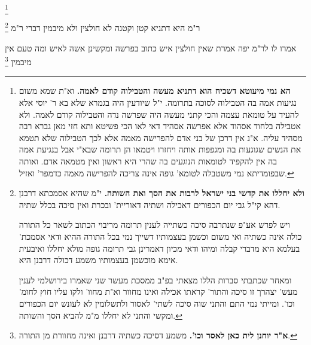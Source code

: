 \documentclass[12pt, openany]{book}
\newcommand{\sethebfont}{
\fontsize{10.5pt}{21.0pt} \selectfont
}
\newcommand{\twocol}[1]{
	{\sethebfont \begin{multicols}{2}
			#1
	\end{multicols}}	
}
\newcommand{\footnotecomment}[1]{\footnote{#1}}
\newcommand{\commenta}[1]{\footnotecomment{#1}}
\begin{document}
\twocol{
\commenta{\textbf{הא נמי מיעוטא דשכיח הוא דתניא מעשה והטבילוה קודם לאמה.}  וא"ת שמא משום נגיעות אמה בה הטבילוה לסוכה בתרומה. י"ל שיודעין היה בגמרא שלא בא ר' יוסי אלא להעיד על טומאת עצמה והכי קתני מעשה היה שפרשה נדה והטבילוה קודם לאמה. ולא אטבילה בלחוד אסהוד אלא אפרשה אסהיד דאי לאו הכי פשיטא ותא חזי מאן גברא רבה מסהיד עליה. א"נ אין דרכן של בני אדם להפרישה מאמה אלא לכך הטבילוה שלא תטמא את הנשים שגוגעות בה ומגפפות אותה ויחזרו ויטמאו הן תרומה שבא"י אבל בנגיעת אמה בה אין להקפיד לטומאות הנוגעים בה שהרי היא ראשון ואין מטמאה אדם. ואותה שבפומדיתא נמי משטבלה לטומא' גופה אינה צריכה להפרישה מאמה כדמפר' ואזיל. }

ר"מ היא  דתניא קטן וקטנה לא חולצין ולא מיבמין דברי ר"מ 
\commenta{\textbf{ולא יחללו את קדשי בני ישראל לרבות את הסך ואת השותה.}  י"מ שהיא אסמכתא דרבנן דהא קי"ל גבי יום הכפורים דאכילה ושתיה דאוריית' ובכרת ואין סיכה בכלל שתיה.\par  ויש לפרש אע"פ שנתרבה סיכה כשתייה לענין תרומה מריבוי הכתוב לשאר כל התורה כולה אינה כשתיה ואי משום וכשמן בעצמותיו דשייך נמי בכל התורה ההיא ודאי אסמכת' בעלמא היא מדברי קבלה ומיהו ודאי מכיון דאמרינן גבי תרומה גופה מולא יחללו ואיבעית אימא מוכשמן בעצמותיו משמע דכולה דרבנן היא.\par  ומאחר שכתבתי סברות הללו מצאתי בפ"ב ממסכת מעשר שני שאמרו בירושלמי לענין מעש' יצהרך זו סיכה והתור' קראתו אכילה ואינו מחוור וא"ת מחוו' ולקו עליו חוץ לחומ' וכו'. ומייתי נמי התם והתני שוה סיכה לשתי' לאסור ולתשלומין לא לעונש יום הכפורים ומקשי והתני לא יחללו מ"מ להביא הסך והשותה. }

אמרו לו לר"מ  יפה אמרת שאין חולצין איש כתוב בפרשה ומקשינן אשה לאיש ומה טעם אין מיבמין 
\commenta{\textbf{א"ר יוחנן לית כאן לאסר וכו'.}  משמע דסיכה כשתיה דרבנן ואינה מחוורת מן התורה. }

}
\end{document}
